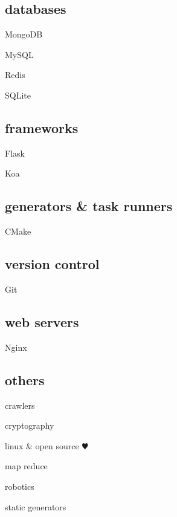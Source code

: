 \documentclass{article}
\def\emcolor{black}
\newcommand{\fgem}{\color{\emcolor}}%
\newenvironment{aside}{%
\noindent
\begin{minipage}[t]{\dimexpr0.25\textwidth}%
\let\oldsection\section
\let\oldsubsection\subsection
\renewcommand{\section}[1]{\oldsection*{\fgem ##1}}
\renewcommand{\subsection}[1]{\oldsubsection*{\small ##1}\vspace{-0.5em}}
\begin{center}%
}{%
\end{center}%
\let\subsection\oldsubsection
\let\section\oldsection
\end{minipage}%
}
\begin{document}
\begin{aside}
\subsection{databases}
\begin{itemize*}
\item{MongoDB}
\item{MySQL}
\item{Redis}
\item{SQLite}
\end{itemize*}

\subsection{frameworks}
\begin{itemize*}
\item{Flask}
\item{Koa}
\end{itemize*}

\subsection{generators \& task runners}
\begin{itemize*}
\item{CMake}
\end{itemize*}

\subsection{version control}
\begin{itemize*}
\item{Git}
\end{itemize*}

\subsection{web servers}
\begin{itemize*}
\item{Nginx}
\end{itemize*}

\subsection{others}
\begin{itemize*}
\item{crawlers}
\item{cryptography}
\item{linux \& open source \color{red}$\varheartsuit$}
\item{map reduce}
\item{robotics}
\item{static generators}
\end{itemize*}


\end{aside}%
\end{document}
